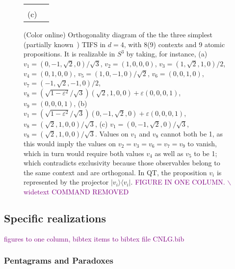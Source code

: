 \documentclass[%
  twocolumn,
 showpacs,
 showkeys,
 preprintnumbers,
 amsmath,amssymb,
 aps,
  pra,
  longbibliography,
 floatfix,
 ]{revtex4-1}
\newcommand{\jr}[1]{\textcolor{purple}{#1}}
\begin{document}
\begin{figure}
\begin{center}
\begin{tabular}{cc}
\begin{tikzpicture}  [scale=0.6]
\end{tikzpicture}
\\
 (c)
\end{tabular}
\end{center}
\caption{\label{fig:d4}
(Color online)
Orthogonality diagram of the  the three  simplest (partially known~\cite{Hardy-93,Cab96,Bad11})
TIFS  in $d=4$, with 8(9) contexts and 9 atomic propositions.
It is realizable in  $S^3$ by taking,
for instance,
(a)
$v_1     = (  {0,-1,\sqrt{2},0}  )/\sqrt{3}$,
$v_2     = (  {1,0,0,0}    )$,
$v_3     = (  {1,\sqrt{2},1,0}   )/ 2 $,
$v_4     = (  {0,1,0,0}    ) $,
$v_5     = (  {1,0,-1,0}     )/\sqrt{2}$,
$v_6     = (  {0,0,1,0}     ) $,
$v_7   = (     {-1,\sqrt{2},-1,0} )/ 2$,
$v_8   =      (\sqrt{1-\varepsilon^2} / \sqrt{3})  ({\sqrt{2},1,0,0})+\varepsilon({0,0,0,1})$,
$v_9     = (   {0,0,0,1} )$,
(b)
$v_1     =   (\sqrt{1-\varepsilon^2} / \sqrt{3})(  {0,-1,\sqrt{2},0}  )+\varepsilon({0,0,0,1})$,
$v_8   =  (        {\sqrt{2},1,0,0} )/\sqrt{3}$,
(c)
$v_1     = (  {0,-1,\sqrt{2},0}  )/\sqrt{3}$,
$v_8   =  (        {\sqrt{2},1,0,0} ) /\sqrt{3}$.
Values on $v_1$ and $v_8$ cannot both be 1, as this would imply the values on $v_2=v_3=v_6=v_7=v_9$ to vanish,
which in turn would require both values $v_4$ as well as $v_5$ to be 1; which contradicts exclusivity
because those observables belong to the same context and are orthogonal.
In QT, the proposition $v_i$ is represented by the projector $| v_i \rangle\langle v_i |$.
\jr{FIGURE IN ONE COLUMN.  $\backslash$widetext COMMAND REMOVED}}

\end{figure}



\subsection{Specific realizations}

\jr{\sc figures to one column, bibtex items to bibtex file CNLG.bib}

\subsubsection{Pentagrams and Paradoxes}
\cite{Bad11}
\end{document}
